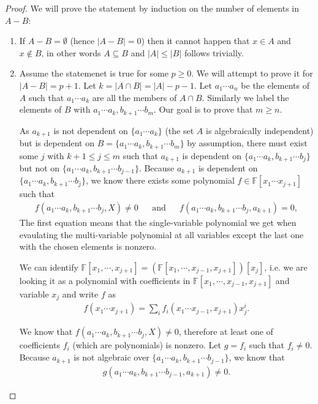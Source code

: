 \begin{proof}
	We will prove the statement by induction on the number of elements in $A - B$:
	\begin{enumerate}
		\item  If $A - B = \emptyset $ (hence $|A -B| = 0$) then it cannot happen that $x\in A$ and $x\notin B$, in other words $A \subseteq B$ and $|A| \leq |B|$ follows trivially.
		\item  Assume the statemenet is true for some $p\geq 0 $. We will attempt to prove it for $|A - B| = p + 1$. Let $k = |A \cap B| = |A| - p - 1$. Let $a _1 \cdots a _n$ be the elements of $A$ such that $a _1 \cdots a_k$ are all the members of $A \cap B$. Similarly we label the elements of $B$ with $ a _1 \cdots a_k, b _{k + 1} \cdots b _m$. Our goal is to prove that $m \geq n$.

		      As $a _{k + 1}$ is not dependent on $\{a _1 \cdots a_k\}$ (the set $A$ is algebraically independent) but is dependent on $B = \{a _1 \cdots a _k, b _{k + 1} \cdots b_m\}$ by assumption, there must exist some $j$ with $k + 1 \leq j \leq m$ such that $a _{k + 1}$ is dependent on $\{a _1 \cdots a _k, b _{k + 1} \cdots b_j\}$ but  not on $\{a _1 \cdots a _k, b _{k + 1} \cdots b _{j - 1}\}$. Because $a _{k + 1}$ is dependent on $\{a _1 \cdots a _k, b _{k + 1} \cdots b_j\}$, we know there exists some polynomial $f \in \mathbb F[x _1 \cdots x _{j + 1}]$ such that
		      \begin{align*}
			      f(a _1 \cdots a _{k}, b _{k + 1} \cdots b _{j}, X) \neq  0 &&\text{and}&&
			      f(a _1 \cdots a _{k}, b _{k + 1} \cdots b _{j}, a _{k + 1})  = 0,
		      \end{align*}
        The first equation means that the single-variable polynomial we get when evaulating the multi-variable polynomial at all variables except the last one with the chosen elements is nonzero. 

		      We can identify $\mathbb{F}[x_1,\cdots,x_{j+1}] = (\mathbb{F}[x_1,\cdots, x_{j-1}, x_{j+1}])[x_j]$, i.e. we are looking it as a polynomial with coefficients in  $\mathbb{F}[x_1,\cdots, x_{j-1}, x_{j+1}]$ and variable $x_j$ and write $f$ as
		      \begin{align*}
			      f(x _1 \cdots x _{j + 1})
			      = \sum_i f _i(x _1 \cdots x _{j - 1}, x _{j + 1}) x _j ^i.
		      \end{align*}

		      We know that $f(a _1 \cdots a _{k}, b _{k + 1} \cdots b _{j}, X) \neq  0$, therefore at least one of coefficients $f _i $ (which are polynomials) is nonzero. Let $g = f _i $ such that $f _i \neq 0$. Because $a _{k + 1}$ is not algebraic over $\{a _1 \cdots a _k, b _{k + 1} \cdots b _{j - 1}\}$, we know that
		      \begin{align*}
			      g(a _1 \cdots a _k, b _{k + 1} \cdots b _{j - 1}, a _{k + 1}) \neq 0.
		      \end{align*}


\end{enumerate}
\end{proof}
